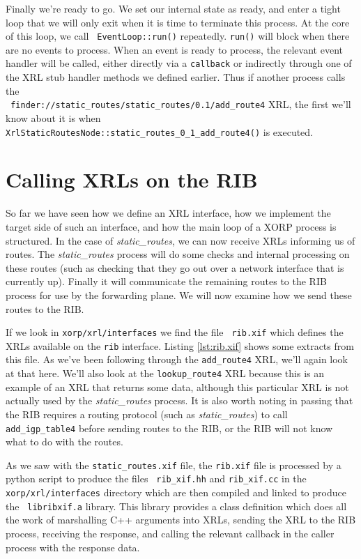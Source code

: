 \documentclass[11pt]{article}
\newcommand{\stt}{\tt\small}
\newcommand{\SRI}{{\it static\_routes}\xspace}
\begin{document}
Finally we're ready to go.  We set our internal state as ready, and
enter a tight loop that we will only exit when it is time to terminate
this process.  At the core of this loop, we call {\stt
EventLoop::run()} repeatedly.  {\stt run()} will block when there are
no events to process.  When an event is ready to process, the relevant
event handler will be called, either directly via a {\stt callback} or
indirectly through one of the XRL stub handler methods we defined
earlier.  Thus if another process calls the \\{\stt
  finder://static\_routes/static\_routes/0.1/add\_route4} XRL, the
first we'll know about it is when {\stt
  XrlStaticRoutesNode::static\_routes\_0\_1\_add\_route4()} is executed.

\newpage
\section{Calling XRLs on the RIB}
\label{rib}

So far we have seen how we define an XRL interface, how we implement
the target side of such an interface, and how the main loop of a XORP
process is structured.  In the case of \SRI, we can now receive XRLs
informing us of routes.  The \SRI process will do some checks and
internal processing on these routes (such as checking that they go out
over a network interface that is currently up).  Finally it will
communicate the remaining routes to the RIB process for use by the
forwarding plane.  We will now examine how we send these routes to the
RIB.

If we look in {\stt xorp/xrl/interfaces} we find the file {\stt
rib.xif} which defines the XRLs available on the {\stt rib} interface.
Listing \ref{lst:rib.xif} shows some extracts from this file.  As
we've been following through the {\stt add\_route4} XRL, we'll again
look at that here.  We'll also look at the {\stt lookup\_route4} XRL
because this is an example of an XRL that returns some data, although
this particular XRL is not actually used by the \SRI process. It is
also worth noting in passing that the RIB requires a routing protocol
(such as \SRI) to call {\stt add\_igp\_table4} before sending routes
to the RIB, or the RIB will not know what to do with the routes.

As we saw with the {\stt static\_routes.xif} file, the {\stt rib.xif}
file is processed by a python script to produce the files {\stt
rib\_xif.hh} and {\stt rib\_xif.cc} in the {\stt xorp/xrl/interfaces}
directory which are then compiled and linked to produce the {\stt
libribxif.a} library.  This library provides a class definition which
does all the work of marshalling C++ arguments into XRLs, sending the
XRL to the RIB process,  receiving the response, and calling the
relevant callback in the caller process with the response data.
\end{document}

